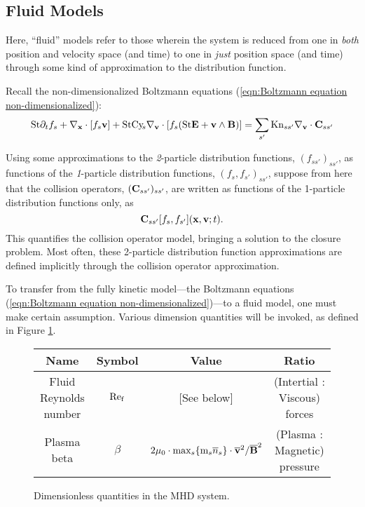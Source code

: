 \subsection{Fluid Models}\label{cha:fluid models}
    \line

    \begin{definition}\label{def:fluid model}
        Here, ``fluid'' models refer to those wherein the system is reduced from one in \emph{both} position and velocity space (and time) to one in \emph{just} position space (and time) through some kind of approximation to the distribution function.
    \end{definition}

    \line
    
    Recall the non-dimensionalized Boltzmann equations (\ref{eqn:Boltzmann equation non-dimensionalized}):
    \begin{equation*}
        \mathrm{St}\partial_{t}f_{s} + \nabla_{\mathbf{x}}\cdot[f_{s}\mathbf{v}] + \mathrm{St}\mathrm{Cy}\!_{s}\nabla_{\mathbf{v}}\cdot[f_{s}(\mathrm{St}\mathbf{E} + \mathbf{v}\wedge\mathbf{B})]  =   \sum_{s'}\mathrm{Kn}_{ss'}\nabla_{\mathbf{v}}\cdot\mathbf{C}_{ss'}
    \end{equation*}
    
    Using some approximations to the \emph{2}-particle distribution functions, $(f_{ss'})_{ss'}$, as functions of the \emph{1}-particle distribution functions, $(f_{s}, f_{s'})_{ss'}$, suppose from here that the collision operators, $(\mathbf{C}_{ss'})_{ss'}$, are written as functions of the 1-particle distribution functions only, as
    \begin{equation}
        \mathbf{C}_{ss'}[f_{s}, f_{s'}](\mathbf{x}, \mathbf{v}; t).
    \end{equation}
    This quantifies the collision operator model, bringing a solution to the closure problem. Most often, these 2-particle distribution function approximations are defined implicitly through the collision operator approximation.

    To transfer from the fully kinetic model---the Boltzmann equations (\ref{eqn:Boltzmann equation non-dimensionalized})---to a fluid model, one must make certain assumption. Various dimension quantities will be invoked, as defined in Figure \ref{fig:fluid dimensionless quantities}.

    \begin{figure}
        \centering
        \begin{tabular}{ c c c c }
            Name  &  Symbol  &  Value  &  Ratio  \\
            \hline\hline
            Fluid Reynolds number  &  $\mathrm{Re}_{\mathrm{f}}$  &  [See below]  &  (Intertial : Viscous) forces  \\
            Plasma beta  &  $\beta$  &  $2\mu_{0}\cdot\max_{s}\{\mathrm{m}_{s}\overline{n}_{s}\}\cdot\overline{\mathbf{v}}^{2}/\overline{\mathbf{B}}^{2}$  &  (Plasma : Magnetic) pressure
        \end{tabular}
        \caption{Dimensionless quantities in the MHD system.}
        \label{fig:fluid dimensionless quantities}
    \end{figure} 


